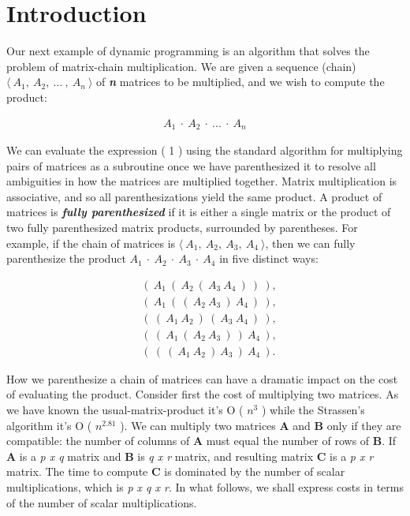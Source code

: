\section{Introduction}

Our next example of dynamic programming is an algorithm that solves the problem of matrix-chain multiplication. We are given a sequence (chain) $\langle\ A_{1},\ A_{2},\ ...\ ,\ A_{n}\ \rangle$ of {\bfseries\itshape n} matrices to be multiplied, and we wish to compute the product: \hfill \break

\begin{ceqn} 
\begin{align}
A_{1}\ \cdot\ A_{2}\ \cdot\ ...\ \cdot\ A_{n}
\end{align} 
\end{ceqn} \hfill

We can evaluate the expression ( 1 ) using the standard algorithm for multiplying pairs of matrices as a subroutine once we have parenthesized it to resolve all ambiguities in how the matrices are multiplied together. Matrix multiplication is associative, and so all parenthesizations yield the same product. A product of matrices is {\bfseries\itshape fully parenthesized} if it is either a single matrix or the product of two fully parenthesized matrix products, surrounded by parentheses. For example, if the chain of matrices is $\langle\ A_{1},\ A_{2},\ A_{3},\ A_{4}\ \rangle$, then we can fully parenthesize the product $A_{1}\ \cdot\ A_{2}\ \cdot\ A_{3}\ \cdot\ A_{4}$ in five distinct ways: \hfill \break

\begin{ceqn}
\begin{align*}
&(\ A_{1}\ (\ A_{2}\ (\ A_{3}\ A_{4}\ )\ )\ ), \\
&(\ A_{1}\ (\ (\ A_{2}\ A_{3}\ )\ A_{4}\ )\ ), \\
&(\ (\ A_{1}\ A_{2}\ )\ (\ A_{3}\ A_{4}\ )\ ), \\
&(\ (\ A_{1}\ (\ A_{2}\ A_{3}\ )\ )\ A_{4}\ ), \\
&(\ (\ (\ A_{1}\ A_{2}\ )\ A_{3}\ )\ A_{4}\ ).
\end{align*}
\end{ceqn} \hfill

How we parenthesize a chain of matrices can have a dramatic impact on the cost of evaluating the product. Consider first the cost of multiplying two matrices. As we have known the usual-matrix-product it's O ( $n^{3}$ ) while the Strassen's algorithm it's O ( $n^{2.81}$ ). We can multiply two matrices {\bfseries A} and {\bfseries B} only if they are compatible: the number of columns of {\bfseries A} must equal the number of rows of {\bfseries B}. If {\bfseries A} is a {\itshape p x q} matrix and {\bfseries B} is {\itshape q x r} matrix, and resulting matrix {\bfseries C} is a {\itshape p x r} matrix. The time to compute {\bfseries C} is dominated by the number of scalar multiplications, which is {\itshape p x q x r}. In what follows, we shall express costs in terms of the number of scalar multiplications. \hfill \break

